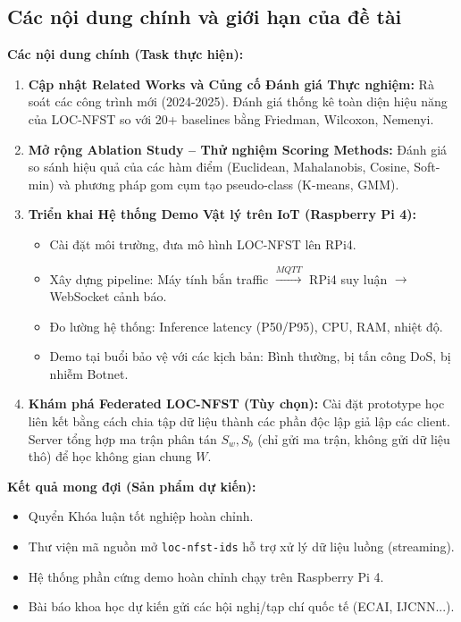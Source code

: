 \documentclass[12pt,a4paper]{article}
\begin{document}
\subsection{Các nội dung chính và giới hạn của đề tài}

\textbf{Các nội dung chính (Task thực hiện):}
\begin{enumerate}
    \item \textbf{Cập nhật Related Works và Củng cố Đánh giá Thực nghiệm:} Rà soát các công trình mới (2024-2025). Đánh giá thống kê toàn diện hiệu năng của LOC-NFST so với 20+ baselines bằng Friedman, Wilcoxon, Nemenyi.
    \item \textbf{Mở rộng Ablation Study -- Thử nghiệm Scoring Methods:} Đánh giá so sánh hiệu quả của các hàm điểm (Euclidean, Mahalanobis, Cosine, Soft-min) và phương pháp gom cụm tạo pseudo-class (K-means, GMM).
    \item \textbf{Triển khai Hệ thống Demo Vật lý trên IoT (Raspberry Pi 4):} 
    \begin{itemize}
        \item Cài đặt môi trường, đưa mô hình LOC-NFST lên RPi4.
        \item Xây dựng pipeline: Máy tính bắn traffic $\xrightarrow{MQTT}$ RPi4 suy luận $\to$ WebSocket cảnh báo.
        \item Đo lường hệ thống: Inference latency (P50/P95), CPU, RAM, nhiệt độ.
        \item Demo tại buổi bảo vệ với các kịch bản: Bình thường, bị tấn công DoS, bị nhiễm Botnet.
    \end{itemize}
    \item \textbf{Khám phá Federated LOC-NFST (Tùy chọn):} Cài đặt prototype học liên kết bằng cách chia tập dữ liệu thành các phần độc lập giả lập các client. Server tổng hợp ma trận phân tán $S_w, S_b$ (chỉ gửi ma trận, không gửi dữ liệu thô) để học không gian chung $W$.
\end{enumerate}

\textbf{Kết quả mong đợi (Sản phẩm dự kiến):}
\begin{itemize}
    \item Quyển Khóa luận tốt nghiệp hoàn chỉnh.
    \item Thư viện mã nguồn mở \texttt{loc-nfst-ids} hỗ trợ xử lý dữ liệu luồng (streaming).
    \item Hệ thống phần cứng demo hoàn chỉnh chạy trên Raspberry Pi 4.
    \item Bài báo khoa học dự kiến gửi các hội nghị/tạp chí quốc tế (ECAI, IJCNN...).
\end{itemize}
\end{document}
